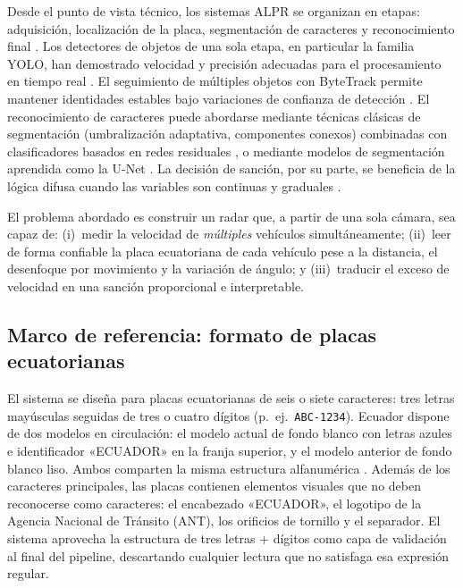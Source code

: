 \documentclass[11pt]{article}
\begin{document}
Desde el punto de vista técnico, los sistemas ALPR se organizan en etapas:
adquisición, localización de la placa, segmentación de caracteres y reconocimiento
final \cite{alpr_survey}. Los detectores de objetos de una sola etapa, en particular
la familia YOLO, han demostrado velocidad y precisión adecuadas para el procesamiento
en tiempo real \cite{yolo11}. El seguimiento de múltiples objetos con ByteTrack
permite mantener identidades estables bajo variaciones de confianza de detección
\cite{bytetrack}. El reconocimiento de caracteres puede abordarse mediante técnicas
clásicas de segmentación (umbralización adaptativa, componentes conexos) combinadas
con clasificadores basados en redes residuales \cite{resnet}, o mediante modelos de
segmentación aprendida como la U-Net \cite{unet}. La decisión de sanción, por su
parte, se beneficia de la lógica difusa cuando las variables son continuas y graduales
\cite{zadeh, mamdani, sugeno}.

El problema abordado es construir un radar que, a partir de una sola cámara, sea
capaz de: (i)~medir la velocidad de \emph{múltiples} vehículos simultáneamente;
(ii)~leer de forma confiable la placa ecuatoriana de cada vehículo pese a la
distancia, el desenfoque por movimiento y la variación de ángulo; y (iii)~traducir el
exceso de velocidad en una sanción proporcional e interpretable.

\subsection{Marco de referencia: formato de placas ecuatorianas}
El sistema se diseña para placas ecuatorianas de seis o siete caracteres: tres letras
mayúsculas seguidas de tres o cuatro dígitos (p.~ej.\ \texttt{ABC-1234}). Ecuador
dispone de dos modelos en circulación: el modelo actual de fondo blanco con letras
azules e identificador «ECUADOR» en la franja superior, y el modelo anterior de fondo
blanco liso. Ambos comparten la misma estructura alfanumérica \cite{alpr_loja}. Además
de los caracteres principales, las placas contienen elementos visuales que no deben
reconocerse como caracteres: el encabezado «ECUADOR», el logotipo de la Agencia
Nacional de Tránsito (ANT), los orificios de tornillo y el separador. El sistema
aprovecha la estructura de tres letras + dígitos como capa de validación al final del
pipeline, descartando cualquier lectura que no satisfaga esa expresión regular.
\end{document}
